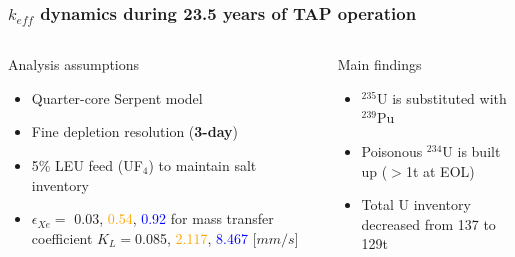 \begin{frame}
\frametitle{$k_{eff}$ dynamics during 23.5 years of TAP operation}
\vspace{-3mm}
\begin{columns}
	\column{4.3cm}
	\begin{block}{Analysis assumptions}
		\fontsize{7}{9}\selectfont
		\begin{itemize}
			\item Quarter-core Serpent model
			\item Fine depletion resolution (\textbf{3-day})
			\item 5\% LEU feed (UF$_4$) to maintain salt inventory
			\item $\epsilon_{Xe}=$\textcolor{ao(english)}{
			0.03}, \textcolor{orange}{0.54}, \textcolor{blue}{0.92} 
			for\newline  
			mass transfer coefficient \newline 
			$K_L=$\textcolor{ao(english)}{0.085}, 
			\textcolor{orange}{2.117}, \textcolor{blue}{8.467} [$mm/s$]
		\end{itemize}
	\end{block}
	\vspace{-2mm}
	\begin{block}{Main findings}
		\fontsize{7}{9}\selectfont
		\begin{itemize}
			\item $^{235}$U is substituted with $^{239}$Pu
			\item Poisonous $^{234}$U is built up ($>$1t at EOL)
			\item Total U inventory decreased from 137 to 129t
		\end{itemize}  
	\end{block}  	
	

\end{columns}
\end{frame}
